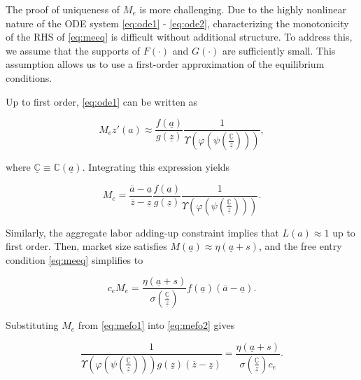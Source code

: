 The proof of uniqueness of $M_e$ is more challenging. Due to the highly nonlinear nature of the ODE system \eqref{eq:ode1} - \eqref{eq:ode2}, characterizing the monotonicity of the RHS of \eqref{eq:meeq} is difficult without additional structure. To address this, we assume that the supports of $F(\cdot)$ and $G(\cdot)$ are sufficiently small. This assumption allows us to use a first-order approximation of the equilibrium conditions. 

Up to first order, \eqref{eq:ode1} can be written as

\begin{equation*}
	M_e z'(a) \approx \frac{f(\underline{a})}{g(\underline{z})} \frac{1}{\Upsilon\left(\varphi\left(\psi\left(\frac{\underline{\mathbb{C}}}{\underline{z}}\right) \right)\right)},
\end{equation*}

where $\underline{\mathbb{C}} \equiv \mathbb{C}(\underline{a})$. Integrating this expression yields

\begin{equation}\label{eq:mefo1}
	M_e  = \frac{\overline{a} - \underline{a}}{\overline{z} - \underline{z}} \frac{f(\underline{a})}{g(\underline{z})} \frac{1}{\Upsilon\left(\varphi\left(\psi\left(\frac{\underline{\mathbb{C}}}{\underline{z}}\right) \right)\right)}.
\end{equation}

Similarly, the aggregate labor adding-up constraint implies that $L(a) \approx 1$ up to first order. Then, market size satisfies $M(\underline{a}) \approx \eta (\underline{a} + s)$, and the free entry condition \eqref{eq:meeq} simplifies to

\begin{equation}\label{eq:mefo2}
    c_e M_e = \frac{\eta (\underline{a} + s)}{\sigma\left(\frac{\underline{\mathbb{C}}}{\underline{z}}\right)} f(\underline{a}) (\overline{a} - \underline{a}).
\end{equation}

Substituting $M_e$ from \eqref{eq:mefo1} into \eqref{eq:mefo2} gives

\begin{equation}\label{eq:mefo3}
	 \frac{1}{\Upsilon\left(\varphi\left(\psi\left(\frac{\underline{\mathbb{C}}}{\underline{z}}\right) \right)\right)g(\underline{z})(\overline{z} - \underline{z})} = \frac{\eta (\underline{a} + s)}{\sigma\left(\frac{\underline{\mathbb{C}}}{\underline{z}}\right) c_e}.
\end{equation}

